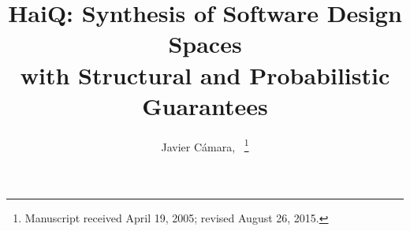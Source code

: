 \documentclass[10pt,journal,compsoc]{IEEEtran}
\begin{document}
%
\title{{\sf HaiQ}: Synthesis of Software Design Spaces \\ with Structural and Probabilistic Guarantees}
%
%
%
%

\author{Javier C\'amara,~%
\thanks{Manuscript received April 19, 2005; revised August 26, 2015.}}

% 
%
\end{document}
